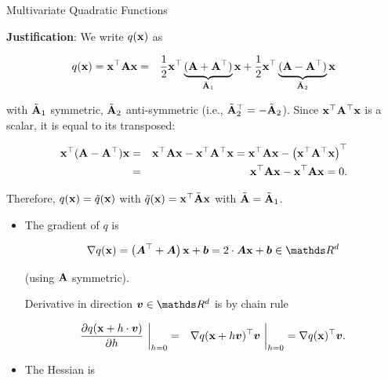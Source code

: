 \documentclass[11pt,compress,t,notes=noshow, xcolor=table]{beamer}
\begin{document}
\begin{vbframe}{Multivariate Quadratic Functions}
  
  \textbf{Justification}: We write $q(\mathbf{x})$ as
  
  \vspace*{-0.3cm}
  
  \begin{eqnarray*}
    q(\mathbf{x}) = \mathbf{x}^\top \mathbf{A} \mathbf{x} &=& \frac{1}{2} \mathbf{x}^\top \underbrace{(\mathbf{A} + \mathbf{A}^\top)}_{\tilde {\mathbf{A}}_1} \mathbf{x} + \frac{1}{2} \mathbf{x}^\top \underbrace{(\mathbf{A} - \mathbf{A}^\top)}_{\tilde {\mathbf{A}}_2} \mathbf{x}
  \end{eqnarray*}
  
  with $\tilde {\mathbf{A}}_1$ symmetric, $\tilde {\mathbf{A}}_2$ anti-symmetric (i.e., $\tilde {\mathbf{A}}_2^\top = - \tilde {\mathbf{A}}_2$). Since $\mathbf{x}^\top \mathbf{A}^\top \mathbf{x}$ is a scalar, it is equal to its transposed: 
  
  \vspace*{-0.3cm}
  
  \begin{eqnarray*}
     \mathbf{x}^\top (\mathbf{A} - \mathbf{A}^\top) \mathbf{x} &=&  \mathbf{x}^\top \mathbf{A} \mathbf{x} - \mathbf{x}^\top \mathbf{A}^\top \mathbf{x} =  \mathbf{x}^\top \mathbf{A} \mathbf{x} - \left(\mathbf{x}^\top \mathbf{A}^\top \mathbf{x}\right)^\top \\
     &=& \mathbf{x}^\top \mathbf{A} \mathbf{x} - \mathbf{x}^\top \mathbf{A} \mathbf{x}  = 0.
  \end{eqnarray*}
  
  Therefore, $q(\mathbf{x}) = \tilde q(\mathbf{x})$ with $\tilde q(\mathbf{x}) = \mathbf{x}^\top \tilde {\mathbf{A}} \mathbf{x}$ with $\tilde {\mathbf{A}} = \tilde {\mathbf{A}}_1$. 
  
  \framebreak 
  
  \begin{itemize}
    \item The gradient of $q$ is 
  
    \begin{eqnarray*}
      \nabla q(\xv) = \left(\bm{A}^\top + \bm{A}\right) \xv + \bm{b} = 2 \cdot \bm{A} \xv + \bm{b} \in \R^d
    \end{eqnarray*}
  
    (using $\mathbf{A}$ symmetric). 
  
    \vspace*{0.2cm}
  
    Derivative in direction $\bm{v}\in \R^d$ is by chain rule
  
    \begin{eqnarray*}
      \frac{\partial q(\mathbf{x} + h \cdot \bm{v})}{\partial h}~\bigg\rvert_{h = 0} &=& \nabla q(\mathbf{x} + h \bm{v})^\top \bm{v}~\bigg\rvert_{h = 0} = \nabla q(\mathbf{x})^\top \bm{v}.
    \end{eqnarray*}
  
  
    \item The Hessian is 
  

\end{itemize}
\end{vbframe}
\end{document}
